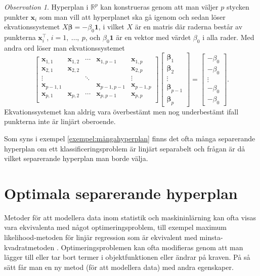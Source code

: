 \documentclass[a4paper, 12pt]{report}
\theoremstyle{definition}
\theoremstyle{remark}
\newtheorem*{rem}{Observation}
\newcommand{\bfbeta}{{\boldsymbol{\beta}}}
\newcommand{\bfx}{\mathbf{x}}
\begin{document}
\begin{rem}
	Hyperplan i $\mathbb{R}^p$ kan konstrueras genom att man väljer $p$ stycken punkter $\mathbf{x}_i$ som man vill att hyperplanet ska gå igenom och sedan löser ekvationssystemet $X\bfbeta=-\beta_0\mathbf{1}$, i vilket $X$ är en matris där raderna består av punkterna $\mathbf{x}_i^\intercal$, $i=1,~\dots,~p$, och $\beta_0\mathbf{1}$ är en vektor med värdet $\beta_0$ i alla rader.
	Med andra ord löser man ekvationssystemet
	\begin{equation*}
		\begin{bmatrix}
		\bfx_{1,1}	& \bfx_{1,2}	& \cdots	& \bfx_{1,p-1}	& \bfx_{1,p}\\
		\bfx_{2,1}	& \bfx_{2,2}	&  			& 				& \bfx_{2,p}\\
		\vdots		&				& \ddots	&				& \vdots\\
		\bfx_{p-1,1}& 				&  			& \bfx_{p-1,p-1}	&\bfx_{p-1,p}\\
		\bfx_{p,1}	& \bfx_{p,2}	& \cdots	& \bfx_{p,p-1}	& \bfx_{p,p}\\
		\end{bmatrix}
		\begin{bmatrix}
		\bfbeta_1\\ \bfbeta_2\\\vdots\\\bfbeta_{p-1}\\\bfbeta_{p}
		\end{bmatrix}=
		\begin{bmatrix}
		-\beta_0\\-\beta_0\\\vdots\\-\beta_0\\-\beta_0
		\end{bmatrix}.
	\end{equation*}
	Ekvationssystemet kan aldrig vara överbestämt men nog underbestämt ifall punkterna inte är linjärt oberoende.
\end{rem}

Som syns i exempel \ref{exempel:mångahyperplan} finns det ofta många separerande hyperplan om ett klassificeringsproblem är linjärt separabelt och frågan är då vilket separerande hyperplan man borde välja.

\section{Optimala separerande hyperplan}
Metoder för att modellera data inom statistik och maskininlärning kan ofta visas vara ekvivalenta med något optimeringsproblem, till exempel maximum likelihood-metoden för linjär regression som är ekvivalent med minsta-kvadratmetoden \cite{MLEOLS}.
Optimeringsproblemen kan ofta modifieras genom att man lägger till eller tar bort termer i objektfunktionen eller ändrar på kraven. På så sätt får man en ny metod (för att modellera data) med andra egenskaper.
\end{document}
